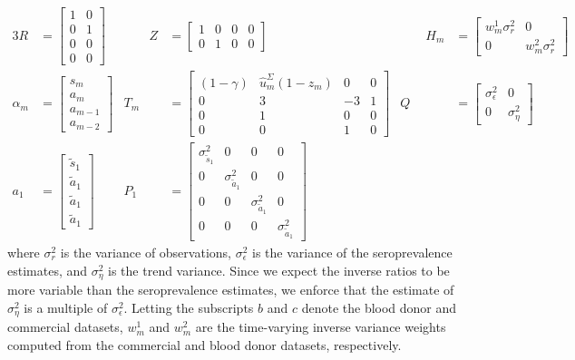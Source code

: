 \begin{alignat*}{3}
R &= \begin{bmatrix}
1 & 0  \\ 
0 & 1 \\ 
0 & 0 \\ 
0 & 0 
\end{bmatrix} &\qquad 
Z &= \begin{bmatrix}
1 & 0 & 0 & 0 \\ 
0 & 1 & 0 & 0 
\end{bmatrix} &\qquad 
H_m &= \begin{bmatrix} %
w^1_{m}\sigma^2_r & 0 \\ 
0 & w^2_{m}\sigma^2_r
\end{bmatrix} \\
\alpha_m &= \begin{bmatrix}
s_{m}\\
a_m\\ 
a_{m-1}\\ 
a_{m-2}
\end{bmatrix} & 
T_m &= \begin{bmatrix}
(1 - \gamma) & \widehat{u}^\Sigma_{m} (1 - z_m) & 0 & 0\\ 
 0 & 3 & -3 & 1 \\ 
 0 & 1 & 0 & 0\\ 
 0 & 0 & 1 & 0
\end{bmatrix}  & 
Q &= \begin{bmatrix} 
\sigma^2_\epsilon & 0  \\ 
0 & \sigma^2_\eta
\end{bmatrix} \\
a_1 &= \begin{bmatrix}
\tilde{s}_{1}\\ 
\tilde{a}_1\\ 
\tilde{a}_1 \\
\tilde{a}_1
\end{bmatrix} & 
P_{1} &= \begin{bmatrix}
\sigma^2_{\tilde{s}_{1}} & 0 & 0 & 0 \\ 
0 & \sigma^2_{\tilde{a}_1} & 0 & 0\\ 
0 & 0 & \sigma^2_{\tilde{a}_1} & 0 \\ 
0 & 0 & 0 & \sigma^2_{\tilde{a}_1}
\end{bmatrix} 
\end{alignat*}
where $\sigma^2_r$ is the variance of observations, $\sigma^2_\epsilon$ is the variance
of the seroprevalence estimates, and $\sigma^2_\eta$ is the trend variance. Since
we expect the inverse ratios to be more variable than the seroprevalence
estimates, we enforce that the estimate of $\sigma^2_\eta$ is a multiple of
$\sigma^2_\epsilon$. Letting the subscripts $b$ and $c$ denote the blood donor and
commercial datasets, $w^1_{m}$ and $w^2_{m}$ are the time-varying inverse
variance weights computed from the commercial and blood donor datasets,
respectively. 

